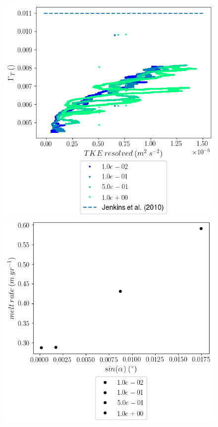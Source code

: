 \documentclass[draft]{styles/agujournal2019}
\begin{document}
\begin{figure}
\begin{minipage}{0.5\textwidth}
    \end{minipage}%
    \begin{minipage}{0.5\textwidth}
        \includegraphics[trim={0 3.5cm 0 0},clip,width=\textwidth]{Figures/gamma_T__e_res__dslope_tlim52.png}
    \end{minipage}%
    \begin{minipage}{0.5\textwidth}
        \includegraphics[trim={0 3.5cm 0 0},clip,width=\textwidth]{Figures/melt_dslope_tav12.png}
    \end{minipage}%
    \label{fig:melt_sensitivity}
\end{figure}
\end{document}
